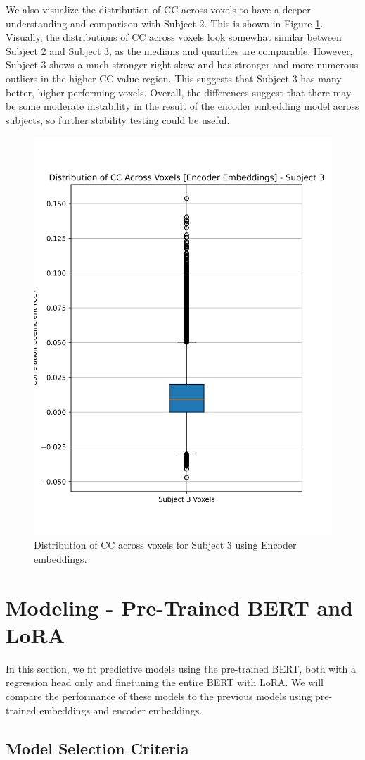 \documentclass[10pt,letterpaper]{article}
\begin{document}
We also visualize the distribution of CC across voxels to have a deeper understanding and comparison with Subject 2. This is shown in Figure \ref{fig:cc_dist_encoder_subj_3}. Visually, the distributions of CC across voxels look somewhat similar between Subject 2 and Subject 3, as the medians and quartiles are comparable. However, Subject 3 shows a much stronger right skew and has stronger and more numerous outliers in the higher CC value region. This suggests that Subject 3 has many better, higher-performing voxels. Overall, the differences suggest that there may be some moderate instability in the result of the encoder embedding model across subjects, so further stability testing could be useful.

\begin{figure}[ht]
    \centering
    \includegraphics[width=0.5\linewidth]{figs/encoder_subj3_cc_dist.png}
    \caption{Distribution of CC across voxels for Subject 3 using Encoder embeddings.}
    \label{fig:cc_dist_encoder_subj_3}
\end{figure}

\section{Modeling - Pre-Trained BERT and LoRA}
In this section, we fit predictive models using the pre-trained BERT, both with a regression head only and finetuning the entire BERT with LoRA. We will compare the performance of these models to the previous models using pre-trained embeddings and encoder embeddings.

\subsection{Model Selection Criteria}
\end{document}
